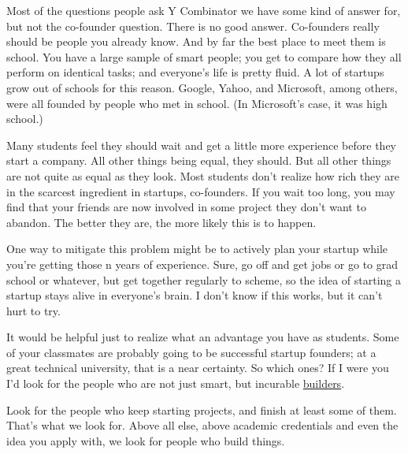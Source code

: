 Most of the
                    questions people ask Y Combinator we have some kind of
                    answer for, but not the co-founder question. There is no
                    good answer. Co-founders really should be people you already
                    know. And by far the best place to meet them is school. You
                    have a large sample of smart people; you get to compare how
                    they all perform on identical tasks; and everyone's life is
                    pretty fluid. A lot of startups grow out of schools for this
                    reason. Google, Yahoo, and Microsoft, among others, were all
                    founded by people who met in school. (In Microsoft's case,
                    it was high school.)

Many students feel they
                    should wait and get a little more experience before they
                    start a company. All other things being equal, they should.
                    But all other things are not quite as equal as they look.
                    Most students don't realize how rich they are in the
                    scarcest ingredient in startups, co-founders. If you wait
                    too long, you may find that your friends are now involved in
                    some project they don't want to abandon. The better they
                    are, the more likely this is to happen.

One way
                    to mitigate this problem might be to actively plan your
                    startup while you're getting those n years of experience.
                    Sure, go off and get jobs or go to grad school or whatever,
                    but get together regularly to scheme, so the idea of
                    starting a startup stays alive in everyone's brain. I don't
                    know if this works, but it can't hurt to try.

It
                    would be helpful just to realize what an advantage you have
                    as students. Some of your classmates are probably going to
                    be successful startup founders; at a great technical
                    university, that is a near certainty. So which ones? If I
                    were you I'd look for the people who are not just smart, but
                    incurable
                    \href{http://my-computer.cruftlabs.com:8080/photos/motorcouch/0067.html}{builders}.
                    
                    Look for the people who keep starting projects, and finish
                    at least some of them. That's what we look for. Above all
                    else, above academic credentials and even the idea you apply
                    with, we look for people who build things.

